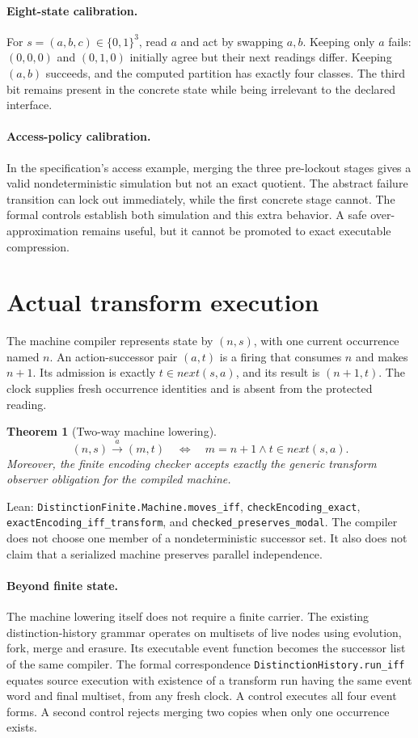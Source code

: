 \documentclass[11pt]{article}
\newtheorem{theorem}{Theorem}
\newcommand{\lean}[1]{\nolinkurl{#1}}
\begin{document}
\paragraph{Eight-state calibration.}
For $s=(a,b,c)\in\{0,1\}^3$, read $a$ and act by swapping $a,b$.
Keeping only $a$ fails: $(0,0,0)$ and $(0,1,0)$ initially agree but their next
readings differ. Keeping $(a,b)$ succeeds, and the computed partition has
exactly four classes. The third bit remains present in the concrete state
while being irrelevant to the declared interface.

\paragraph{Access-policy calibration.}
In the specification's access example, merging the three pre-lockout stages
gives a valid nondeterministic simulation but not an exact quotient. The
abstract failure transition can lock out immediately, while the first
concrete stage cannot. The formal controls establish both simulation and
this extra behavior. A safe over-approximation remains useful, but it cannot
be promoted to exact executable compression.

\section{Actual transform execution}
The machine compiler represents state by $(n,s)$, with one current occurrence
named $n$. An action-successor pair $(a,t)$ is a firing that consumes $n$ and
makes $n+1$. Its admission is exactly $t\in\mathit{next}(s,a)$, and its result
is $(n+1,t)$. The clock supplies fresh occurrence identities and is absent
from the protected reading.

\begin{theorem}[Two-way machine lowering]
\[
 (n,s)\xrightarrow{a}(m,t)
 \quad\Longleftrightarrow\quad
 m=n+1\land t\in\mathit{next}(s,a).
\]
Moreover, the finite encoding checker accepts exactly the generic transform
observer obligation for the compiled machine.
\end{theorem}
\noindent Lean: \lean{DistinctionFinite.Machine.moves_iff},
\lean{checkEncoding_exact}, \lean{exactEncoding_iff_transform}, and
\lean{checked_preserves_modal}. The compiler does not choose one member of a
nondeterministic successor set. It also does not claim that a serialized
machine preserves parallel independence.

\paragraph{Beyond finite state.}
The machine lowering itself does not require a finite carrier. The existing
distinction-history grammar operates on multisets of live nodes using
evolution, fork, merge and erasure. Its executable event function becomes the
successor list of the same compiler. The formal correspondence
\lean{DistinctionHistory.run_iff} equates source execution with existence of a
transform run having the same event word and final multiset, from any fresh
clock. A control executes all four event forms. A second control rejects
merging two copies when only one occurrence exists.
\end{document}
